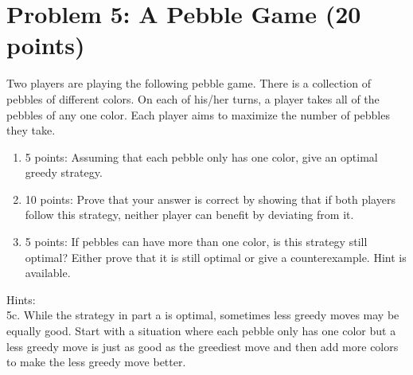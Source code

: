 \documentclass[12pt]{article}
\begin{document}
\section*{Problem 5: A Pebble Game (20 points)}
Two players are playing the following pebble game. There is a collection of pebbles of different colors. On each of his/her turns, a player takes all of the pebbles of any one color. Each player aims to maximize the number of pebbles they take.
\begin{enumerate}
\item[(a)] 5 points: Assuming that each pebble only has one color, give an optimal greedy strategy. 
\item[(b)] 10 points: Prove that your answer is correct by showing that if both players follow this strategy, neither player can benefit by deviating from it.
\item[(c)] 5 points: If pebbles can have more than one color, is this strategy still optimal? Either prove that it is still optimal or give a counterexample. Hint is available.
\end{enumerate}
\newpage
\noindent Hints:\\
5c. While the strategy in part a is optimal, sometimes less greedy moves may be equally good. Start with a situation where each pebble only has one color but a less greedy move is just as good as the greediest move and then add more colors to make the less greedy move better.
\end{document}
